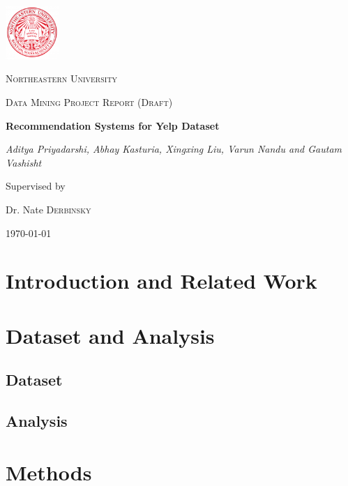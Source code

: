 \documentclass[11pt]{article}
\begin{document}
	\begin{titlepage}
		\centering
		\includegraphics[width=0.15\textwidth]{NU_logo.png}\par\vspace{1cm}
		{\scshape\LARGE Northeastern University \par}
		\vspace{1cm}
		{\scshape\Large Data Mining Project Report (Draft)\par}
		\vspace{1.5cm}
		{\huge\bfseries Recommendation Systems for Yelp Dataset\par}
		\vspace{2cm}
		{\Large\itshape Aditya Priyadarshi, Abhay Kasturia, Xingxing Liu, Varun Nandu and Gautam Vashisht \par}
		\vfill
		Supervised by\par
		Dr. Nate \textsc{Derbinsky}
		
		\vfill
		
		{\large \today\par}
	\end{titlepage}
	
	\section{Introduction and Related Work}
	
	
	\bigskip
	
	
	\section{Dataset and Analysis} 
		\subsection{Dataset}
		 
		
		\subsection{Analysis}
		
		
	\section{Methods}
		
\end{document}
